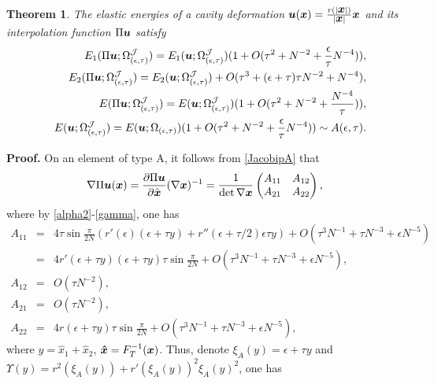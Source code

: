 \documentclass[12pt]{article}
\renewcommand{\vec}[1]{\mbox{\boldmath$#1$}}
\newtheorem{theorem}{Theorem}[section]
\numberwithin{equation}{section}
\begin{document}
\begin{theorem}\label{error energy}
The elastic energies
of a cavity deformation $\vec{u}(\vec{x})=\frac{r(|\vec{x}|)}{|\vec{x}|}\vec{x}$ and its
interpolation function $\Pi \vec{u}$ satisfy
\begin{eqnarray}
&&E_1(\Pi \vec{u};\Omega^{\mathcal{J}}_{(\epsilon,\tau)})=
E_1(\vec{u};\Omega^{\mathcal{J}}_{(\epsilon,\tau)})(1+
O(\tau^2+N^{-2}+\frac{\epsilon}{\tau}N^{-4})),
\label{error E13}\\
&&E_2(\Pi \vec{u};\Omega^{\mathcal{J}}_{(\epsilon,\tau)})=
E_2(\vec{u};\Omega^{\mathcal{J}}_{(\epsilon,\tau)})+O(\tau^3+(\epsilon+\tau)\tau
N^{-2}+N^{-4}), \label{error E23}\\
&&E(\Pi \vec{u};\Omega^{\mathcal{J}}_{(\epsilon,\tau)})=
E(\vec{u};\Omega^{\mathcal{J}}_{(\epsilon,\tau)})(1+O(\tau^2+N^{-2}+\frac{N^{-4}}
{\tau})), \label{error E3}\\
&&E(\vec{u};\Omega^{\mathcal{J}}_{(\epsilon,\tau)})=
E(\vec{u};\Omega_{(\epsilon,\tau)})(1+O(\tau^2+N^{-2}+\frac{\epsilon}{\tau}N^{-4}))
\sim A(\epsilon,\tau). \label{Eo}
\end{eqnarray}
\end{theorem}
\textbf{Proof.} On an element of type A, it follows from \eqref{JacobipA} that
\begin{equation*}
\nabla \Pi \vec{u}(\vec{x})=\frac{\partial \Pi \vec{u}}
{\partial \hat{\vec{x}}} (\nabla \vec{x})^{-1} = \frac{1}{\det \nabla \vec{x}}
\begin{pmatrix} A_{11} & A_{12}\\ A_{21} & A_{22} \end{pmatrix},
\end{equation*}
where by \eqref{alpha2}-\eqref{gamma}, one has
\begin{eqnarray*}
A_{11}&=&4\tau\sin{\frac{\pi}{2N}}(r'(\epsilon)(\epsilon+\tau y)+r''(\epsilon+\tau/2)\epsilon
\tau y)+O(\tau^3N^{-1}+\tau N^{-3}+\epsilon N^{-5})\\
&=& 4r'(\epsilon+\tau y)(\epsilon+\tau y)\tau \sin{\frac{\pi}{2N}}+
O(\tau^3N^{-1}+\tau N^{-3}+\epsilon N^{-5}),\\
A_{12}&=&O(\tau N^{-2}), \\ A_{21}&=&O(\tau N^{-2}),\\
A_{22}&=&4r(\epsilon+\tau y)\tau \sin{\frac{\pi}{2N}}+O(\tau^3N^{-1}+\tau N^{-3}+
\epsilon N^{-5}),
\end{eqnarray*}
where $y=\hat{x}_1+\hat{x}_2$, $\vec{\hat{x}}=F_T^{-1}(\vec{x})$.
Thus, denote $\xi_A(y)=\epsilon+\tau y$ and
$\Upsilon(y)=r^2(\xi_A(y))+r'(\xi_A(y))^2\xi_A(y)^2$, one has
\end{document}

